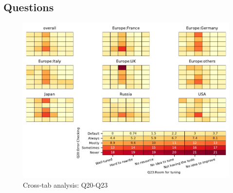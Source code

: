 
\subsection{Questions}


\begin{figure}
\begin{center}
\includegraphics[width=12cm]{../pdfs/Q20-Q23.pdf}
\caption{Cross-tab analysis: Q20-Q23}
\label{fig:Q20-Q23}
\end{center}
\end{figure}
